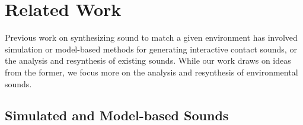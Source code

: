 \documentclass{acmsiggraph}               %
\begin{document}


\section{Related Work}

Previous work on synthesizing sound to match a given environment has 
involved simulation or model-based methods for generating interactive 
contact sounds, or the analysis and resynthesis of existing sounds. 
While our work draws on ideas from the former, we focus more on the 
analysis and resynthesis of environmental sounds.

         
\subsection{Simulated and Model-based Sounds}
\end{document}
